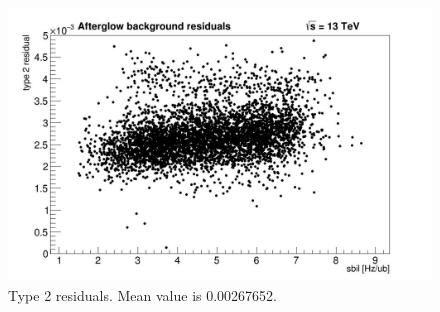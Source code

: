 \begin{itemize}
\begin{figure}[!htp]
{}
\label{fig:type1}
\end{figure}


















\begin{figure}[!htp]
\centering
\includegraphics[width=1\textwidth]{ashish_thesis/type2res_gr0.5_rangefixed.png}
\caption[]{%
  Type 2 residuals.  Mean value is 0.00267652.
 }
\label{fig:type2}
\end{figure}









\end{itemize}
